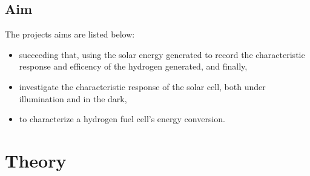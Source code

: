 \documentclass{article}
\begin{document}
    \subsection{Aim}
        The projects aims are listed below:
        \begin{itemize}
            \item succeeding that, using the solar energy generated to record the characteristic response and efficency 
            of the hydrogen generated, and finally,
            \item investigate the characteristic response of the solar cell, both under illumination and in the dark,
            \item to characterize a hydrogen fuel cell's energy conversion.
        \end{itemize} 
    \section{Theory}
\end{document}
